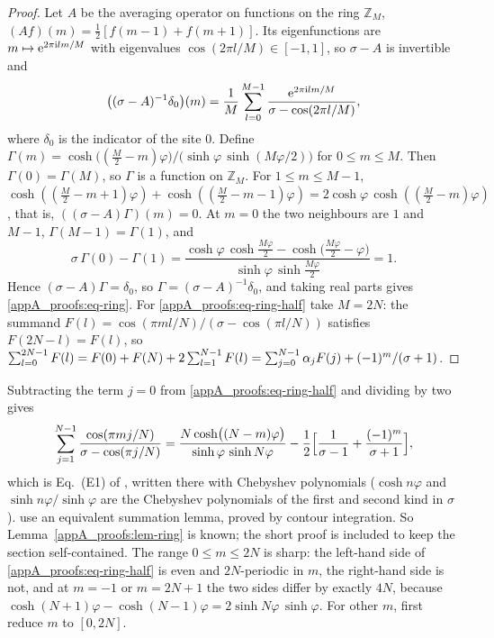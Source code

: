 \begin{proof}
Let $A$ be the averaging operator on functions on the ring $\mathbb Z_M$, $(Af)(m)=\tfrac12[f(m-1)+f(m+1)]$. Its
eigenfunctions are $m\mapsto\mathrm{e}^{2\pi\mathrm{i} lm/M}$ with eigenvalues $\cos(2\pi l/M)\in[-1,1]$, so $\sigma-A$ is
invertible and
\[
  \bigl((\sigma-A)^{-1}\delta_0\bigr)(m)=\frac1M\sum_{l=0}^{M-1}\frac{\mathrm{e}^{2\pi\mathrm{i} lm/M}}{\sigma-\cos(2\pi l/M)},
\]
where $\delta_0$ is the indicator of the site $0$. Define
$\Gamma(m)=\cosh\bigl((\tfrac M2-m)\varphi\bigr)/\bigl(\sinh\varphi\,\sinh(M\varphi/2)\bigr)$ for $0\le m\le M$. Then
$\Gamma(0)=\Gamma(M)$, so $\Gamma$ is a function on $\mathbb Z_M$. For $1\le m\le M-1$,
$\cosh((\tfrac M2-m+1)\varphi)+\cosh((\tfrac M2-m-1)\varphi)=2\cosh\varphi\,\cosh((\tfrac M2-m)\varphi)$, that is,
$((\sigma-A)\Gamma)(m)=0$. At $m=0$ the two neighbours are $1$ and $M-1$, $\Gamma(M-1)=\Gamma(1)$, and
\[
  \sigma\,\Gamma(0)-\Gamma(1)=\frac{\cosh\varphi\,\cosh\frac{M\varphi}{2}-\cosh\bigl(\frac{M\varphi}{2}-\varphi\bigr)}
  {\sinh\varphi\,\sinh\frac{M\varphi}{2}}=1 .
\]
Hence $(\sigma-A)\Gamma=\delta_0$, so $\Gamma=(\sigma-A)^{-1}\delta_0$, and taking real parts gives
\eqref{appA_proofs:eq-ring}. For \eqref{appA_proofs:eq-ring-half} take $M=2N$: the summand
$F(l)=\cos(\pi ml/N)/(\sigma-\cos(\pi l/N))$ satisfies $F(2N-l)=F(l)$, so
$\sum_{l=0}^{2N-1}F(l)=F(0)+F(N)+2\sum_{l=1}^{N-1}F(l)=\sum_{j=0}^{N-1}\alpha_{j}F(j)+(-1)^{m}/(\sigma+1)$.
\end{proof}

\begin{remark}
Subtracting the term $j=0$ from \eqref{appA_proofs:eq-ring-half} and dividing by two gives
\[
  \sum_{j=1}^{N-1}\frac{\cos(\pi mj/N)}{\sigma-\cos(\pi j/N)}=\frac{N\cosh\bigl((N-m)\varphi\bigr)}{\sinh\varphi\,\sinh N\varphi}
  -\frac12\Bigl[\frac{1}{\sigma-1}+\frac{(-1)^{m}}{\sigma+1}\Bigr],
\]
which is Eq.~(E1) of \citet{Giuggioli2020}, written there with Chebyshev polynomials
($\cosh n\varphi$ and $\sinh n\varphi/\sinh\varphi$ are the Chebyshev polynomials of the first and second kind
in $\sigma$). \citet{EssamWu2009} use an equivalent summation lemma, proved by
contour integration. So Lemma~\ref{appA_proofs:lem-ring} is known; the short proof is included to keep the
section self-contained. The range $0\le m\le2N$ is sharp: the left-hand side of \eqref{appA_proofs:eq-ring-half}
is even and $2N$-periodic in $m$, the right-hand side is not, and at $m=-1$ or $m=2N+1$ the two sides differ by
exactly $4N$, because $\cosh(N+1)\varphi-\cosh(N-1)\varphi=2\sinh N\varphi\,\sinh\varphi$. For other $m$, first
reduce $m$ to $[0,2N]$.
\end{remark}

